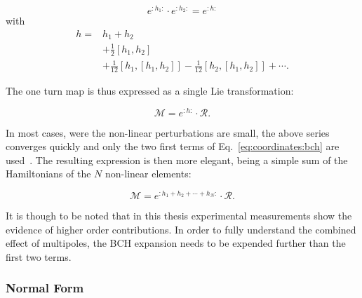 \begin{equation}
    e^{:h_1:} \cdot e^{:h_2:} = e^{:h:}
\end{equation}
with 
\begin{equation}
    \begin{aligned}
        h =& h_1 + h_2 \\
           & + \frac{1}{2} [h_1, h_2] \\
           & + \frac{1}{12} [h_1, [h_1, h_2]] - \frac{1}{12} [h_2, [h_1, h_2]] + \cdots.
    \end{aligned}
    \label{eq:coordinates:bch}
\end{equation}

The one turn map is thus expressed as a single Lie transformation:

\begin{equation}
    \mathcal{M} = e^{:h:} \cdot \mathcal{R}.
\end{equation}

In most cases, were the non-linear perturbations are small, the above series converges quickly
and only the two first terms of Eq.~\eqref{eq:coordinates:bch} are
used~\cite{carlier_nonlinear_2020-1}. The resulting expression is then more elegant, being a simple
sum of the Hamiltonians of the $N$ non-linear elements:

\begin{equation}
   \mathcal{M} = e^{:h_1 + h_2 + \cdots + h_N:} \cdot \mathcal{R}.
\end{equation}

It is though to be noted that in this thesis experimental measurements show the evidence of higher
order contributions. In order to fully understand the combined effect of multipoles, the BCH
expansion needs to be expended further than the first two terms.


\subsubsection{Normal Form}

